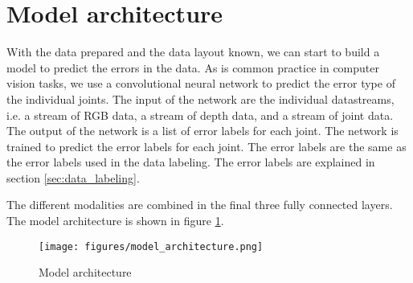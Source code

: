 \section{Model architecture}
\label{sec:model_architecture}

With the data prepared and the data layout known, we can start to build a model to predict the errors in the data. As is common practice in computer vision tasks, we use a convolutional neural network to predict the error type of the individual joints. The input of the network are the individual datastreams, i.e. a stream of RGB data, a stream of depth data, and a stream of joint data. The output of the network is a list of error labels for each joint. The network is trained to predict the error labels for each joint. The error labels are the same as the error labels used in the data labeling. The error labels are explained in section \ref{sec:data_labeling}. 

The different modalities are combined in the final three fully connected layers. The model architecture is shown in figure \ref{fig:model_architecture}.

\begin{figure}[h]
  \centering
  \texttt{[image: figures/model\_architecture.png]}
  \caption{Model architecture}
  \label{fig:model_architecture}
\end{figure}

